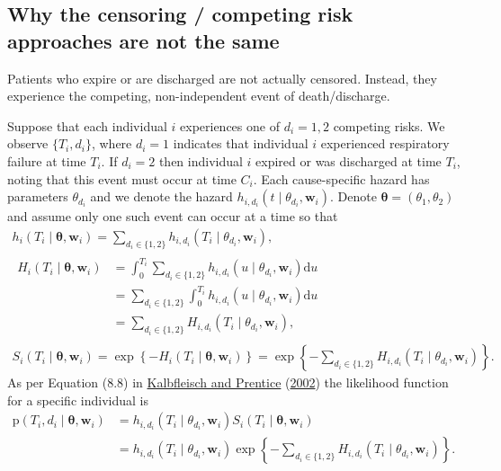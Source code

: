 \documentclass[
  10pt,
  a4paper,
]{article}
\newcommand{\pd}{\text{p}}
\begin{document}
\hypertarget{why-the-censoring-competing-risk-approaches-are-not-the-same}{%
\subsection{Why the censoring / competing risk approaches are not the
same}\label{why-the-censoring-competing-risk-approaches-are-not-the-same}}

Patients who expire or are discharged are not actually censored.
Instead, they experience the competing, non-independent event of
death/discharge.

Suppose that each individual \(i\) experiences one of \(d_{i} = 1, 2\)
competing risks. We observe \(\{T_{i}, d_{i}\}\), where \(d_{i} = 1\)
indicates that individual \(i\) experienced respiratory failure at time
\(T_{i}\). If \(d_{i} = 2\) then individual \(i\) expired or was
discharged at time \(T_{i}\), noting that this event must occur at time
\(C_{i}\). Each cause-specific hazard has parameters \(\theta_{d_{i}}\)
and we denote the hazard
\(h_{i, d_{i}}(t \mid \theta_{d_{i}}, \boldsymbol{w}_{i})\). Denote
\(\boldsymbol{\theta} = (\theta_{1}, \theta_{2})\) and assume only one
such event can occur at a time so that \begin{gather}
  h_{i}(T_{i} \mid \boldsymbol{\theta}, \boldsymbol{w}_{i}) = \sum_{d_{i} \in \{1, 2\}} h_{i, d_{i}}(T_{i} \mid \theta_{d_{i}}, \boldsymbol{w}_{i}), \\
  \begin{aligned}
  H_{i}(T_{i} \mid \boldsymbol{\theta}, \boldsymbol{w}_{i})
    &= \int_{0}^{T_{i}} \sum_{d_{i} \in \{1, 2\}} h_{i, d_{i}}(u \mid \theta_{d_{i}}, \boldsymbol{w}_{i}) \text{d}u \\
    &= \sum_{d_{i} \in \{1, 2\}} \int_{0}^{T_{i}} h_{i, d_{i}}(u \mid \theta_{d_{i}}, \boldsymbol{w}_{i}) \text{d}u \\
    &= \sum_{d_{i} \in \{1, 2\}} H_{i, d_{i}}(T_{i} \mid \theta_{d_{i}}, \boldsymbol{w}_{i}),
  \end{aligned} \\
  S_{i}(T_{i} \mid \boldsymbol{\theta}, \boldsymbol{w}_{i})
    = \exp\left\{-H_{i}(T_{i} \mid \boldsymbol{\theta}, \boldsymbol{w}_{i})\right\}
    = \exp\left\{-\sum_{d_{i} \in \{1, 2\}} H_{i, d_{i}}(T_{i} \mid \theta_{d_{i}}, \boldsymbol{w}_{i})\right\}.
\end{gather} As per Equation (8.8) in
\protect\hyperlink{ref-kalbfleisch_statistical_2002}{Kalbfleisch and
Prentice} (\protect\hyperlink{ref-kalbfleisch_statistical_2002}{2002})
the likelihood function for a specific individual is \begin{align*}
  \pd(T_{i}, d_{i} \mid \boldsymbol{\theta}, \boldsymbol{w}_{i})
    &= h_{i, d_{i}}(T_{i} \mid \theta_{d_{i}}, \boldsymbol{w}_{i}) S_{i}(T_{i} \mid \boldsymbol{\theta}, \boldsymbol{w}_{i}) \\
    &= h_{i, d_{i}}(T_{i} \mid \theta_{d_{i}}, \boldsymbol{w}_{i}) \exp\left\{-\sum_{d_{i} \in \{1, 2\}} H_{i, d_{i}}(T_{i} \mid \theta_{d_{i}}, \boldsymbol{w}_{i})\right\}.
\end{align*}
\end{document}

